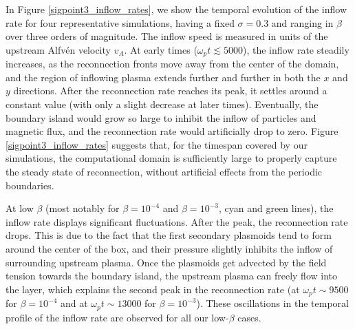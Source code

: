 In Figure \ref{sigpoint3_inflow_rates}, we show the temporal evolution of the inflow rate for four representative simulations, having a fixed $\sigma=0.3$ and ranging in $\beta$ over three orders of magnitude. The inflow speed is measured in units of the upstream Alfv\'{e}n velocity $v_A$. At early times ($\omega_{p}t\lesssim 5000$), the inflow rate steadily increases, as the reconnection fronts move away from the center of the domain, and the region of inflowing plasma  extends further and further in both the $x$ and $y$ directions. 
After the reconnection rate reaches its peak, it settles around a constant value (with only a slight decrease at later times). Eventually, the boundary island would grow so large to inhibit the inflow of particles and magnetic flux, and the reconnection rate would artificially drop to zero. Figure \ref{sigpoint3_inflow_rates} suggests that, for the timespan covered by our simulations, the computational domain is sufficiently large to properly capture the steady state of reconnection, without artificial effects from the periodic boundaries.

At low $\beta$  (most notably for $\beta=10^{-4}$ and $\beta=10^{-3}$, cyan and green lines), the inflow rate displays significant fluctuations. After the peak, the reconnection rate drops. This is due to the fact that 
the first secondary plasmoids tend to form around the center of the box, and their pressure slightly inhibits the inflow of surrounding upstream plasma. Once the plasmoids get advected by the field tension towards the boundary island, the upstream plasma can freely flow into the layer, which explains the second peak in the reconnection rate (at $\omega_{p}t\sim 9500$ for $\beta=10^{-4}$ and at $\omega_{p}t\sim 13000$ for $\beta=10^{-3}$). These oscillations in the temporal profile of the inflow rate are observed for all our low-$\beta$ cases.

